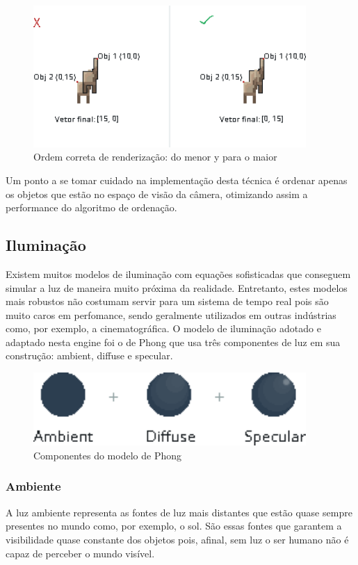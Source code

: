 \documentclass[12pt, 
openright, 
oneside, 
a4paper,    
brazil]{facom-ufu-abntex2}
\begin{document}
\begin{figure}[H]
	\centering
	\includegraphics[width=28em]{imagens/z-order.png}
	\caption{Ordem correta de renderização: do menor y para o maior}
\end{figure}

Um ponto a se tomar cuidado na implementação desta técnica é ordenar apenas os objetos que estão no espaço de visão da câmera, otimizando assim a performance do algoritmo de ordenação.


\subsection{Iluminação}
Existem muitos modelos de iluminação com equações sofisticadas que conseguem simular a luz de maneira muito próxima da realidade. Entretanto, estes modelos mais robustos não costumam servir para um sistema de tempo real pois são muito caros em perfomance, sendo geralmente utilizados em outras indústrias como, por exemplo, a cinematográfica.
O modelo de iluminação adotado e adaptado nesta engine foi o de Phong \cite{PhongShading} que usa três componentes de luz em sua construção: ambient, diffuse e specular.

\begin{figure}[H]
	\centering
	\includegraphics[width=28em]{imagens/lightning.png}
	\caption{Componentes do modelo de Phong}
\end{figure}


\subsubsection{Ambiente}
A luz ambiente representa as fontes de luz mais distantes que estão quase sempre presentes no mundo como, por exemplo, o sol. São essas fontes que garantem a visibilidade quase constante dos objetos pois, afinal, sem luz o ser humano não é capaz de perceber o mundo visível.
\end{document}
